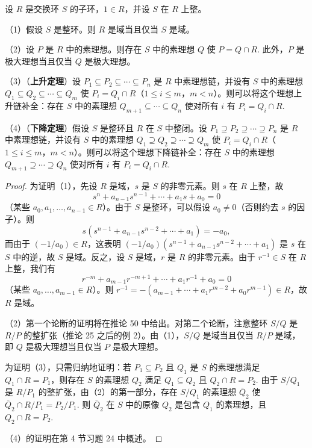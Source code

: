 \begin{theorem}\label{thm:15.26}
设 \(R\) 是交换环 \(S\) 的子环，\(1 \in R\)，并设 \(S\) 在 \(R\) 上整。

（1）假设 \(S\) 是整环。则 \(R\) 是域当且仅当 \(S\) 是域。

（2）设 \(P\) 是 \(R\) 中的素理想。则存在 \(S\) 中的素理想 \(Q\) 使 \(P = Q \cap R\). 此外，\(P\) 是极大理想当且仅当 \(Q\) 是极大理想。

（3）（\textbf{上升定理}）设 \(P_1 \subseteq P_2 \subseteq \cdots \subseteq P_n\) 是 \(R\) 中素理想链，并设有 \(S\) 中的素理想 \(Q_1 \subseteq Q_2 \subseteq \cdots \subseteq Q_m\) 使 \(P_i = Q_i \cap R\)（\(1 \leq i \leq m\)，\(m < n\)）。则可以将这个理想上升链补全：存在 \(S\) 中的素理想 \(Q_{m+1} \subseteq \cdots \subseteq Q_n\) 使对所有 \(i\) 有 \(P_i = Q_i \cap R\).

（4）（\textbf{下降定理}）假设 \(S\) 是整环且 \(R\) 在 \(S\) 中整闭。设 \(P_1 \supseteq P_2 \supseteq \cdots \supseteq P_n\) 是 \(R\) 中素理想链，并设有 \(S\) 中的素理想 \(Q_1 \supseteq Q_2 \supseteq \cdots \supseteq Q_m\) 使 \(P_i = Q_i \cap R\)（\(1 \leq i \leq m\)，\(m < n\)）。则可以将这个理想下降链补全：存在 \(S\) 中的素理想 \(Q_{m+1} \supseteq \cdots \supseteq Q_n\) 使对所有 \(i\) 有 \(P_i = Q_i \cap R\).
\end{theorem}

\begin{proof}
为证明（1），先设 \(R\) 是域，\(s\) 是 \(S\) 的非零元素。则 \(s\) 在 \(R\) 上整，故
\[
s^n+a_{n-1}s^{n-1}+\cdots+a_1s+a_0 = 0
\]
（某些 \(a_0, a_1, \ldots, a_{n-1} \in R\)）。由于 \(S\) 是整环，可以假设 \(a_0 \neq 0\)（否则约去 \(s\) 的因子）。则
\[
s(s^{n-1}+a_{n-1}s^{n-2}+\cdots+a_1) = -a_0,
\]
而由于 \((-1/a_0) \in R\)，这表明 \((-1/a_0)(s^{n-1}+a_{n-1}s^{n-2}+\cdots+a_1)\) 是 \(s\) 在 \(S\) 中的逆，故 \(S\) 是域。反之，设 \(S\) 是域，\(r\) 是 \(R\) 的非零元素。由于 \(r^{-1} \in S\) 在 \(R\) 上整，我们有
\[
r^{-m}+a_{m-1}r^{-m+1}+\cdots+a_1r^{-1}+a_0 = 0
\]
（某些 \(a_0, \ldots, a_{m-1} \in R\)）。则 \(r^{-1} = -(a_{m-1}+\cdots+a_1r^{m-2}+a_0r^{m-1}) \in R\)，故 \(R\) 是域。

（2）第一个论断的证明将在推论 50 中给出。对第二个论断，注意整环 \(S/Q\) 是 \(R/P\) 的整扩张（推论 25 之后的例 2）。由（1），\(S/Q\) 是域当且仅当 \(R/P\) 是域，即 \(Q\) 是极大理想当且仅当 \(P\) 是极大理想。

为证明（3），只需归纳地证明：若 \(P_1 \subseteq P_2\) 且 \(Q_1\) 是 \(S\) 的素理想满足 \(Q_1 \cap R = P_1\)，则存在 \(S\) 的素理想 \(Q_2\) 满足 \(Q_1 \subseteq Q_2\) 且 \(Q_2 \cap R = P_2\). 由于 \(S/Q_1\) 是 \(R/P_1\) 的整扩张，由（2）的第一部分，存在 \(S/Q_1\) 的素理想 \(\bar Q_2\) 使 \(\bar Q_2 \cap R/P_1 = P_2/P_1\). 则 \(\bar Q_2\) 在 \(S\) 中的原像 \(Q_2\) 是包含 \(Q_1\) 的素理想，且 \(Q_2 \cap R = P_2\).

（4）的证明在第 4 节习题 24 中概述。
\end{proof}

